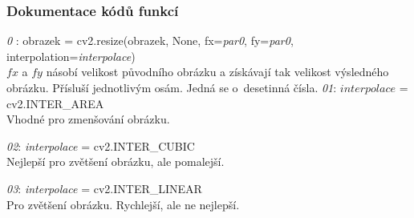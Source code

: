 \documentclass[12pt]{report}			%
\begin{document}
	\subsubsection{Dokumentace kódů funkcí}
	\label{sec:docs}
	\begin{outline}
\1 \emph{0} : obrazek = cv2.resize(obrazek, None, fx=\emph{par0}, fy=\emph{par0}, \\interpolation=\emph{interpolace})\\
	$fx$ a $fy$ násobí velikost původního obrázku a získávají tak velikost výsledného obrázku. Přísluší jednotlivým osám. Jedná se o~desetinná čísla. \parencite{CV_resize}
	\2 \emph{01}: $interpolace$ = cv2.INTER\_AREA\\ Vhodné pro zmenšování obrázku.
	
	\2 \emph{02}: \emph{interpolace} = cv2.INTER\_CUBIC\\ Nejlepší pro zvětšení obrázku, ale pomalejší.
	
	\2 \emph{03}: \emph{interpolace} = cv2.INTER\_LINEAR\\ Pro zvětšení obrázku. Rychlejší, ale ne nejlepší.  
	

\end{outline}
\end{document}

